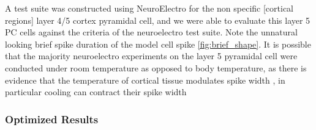 A test suite was constructed using NeuroElectro for the non specific [cortical regions] layer 4/5 cortex pyramidal cell, and we were able to evaluate this layer 5 PC cells against the criteria of the neuroelectro test suite. Note the unnatural looking brief spike duration of the model cell spike  \ref{fig:brief_shape}. It is possible that the majority neuroelectro experiments on the layer 5 pyramidal cell were conducted under room temperature as opposed to body temperature, as there is evidence that the temperature of cortical tissue modulates spike width \cite{goldin2017temperature}, in particular cooling can contract their spike width

%



\subsubsection{Optimized Results}
\begin{table}[ht]
\centering
{}

\end{table}

